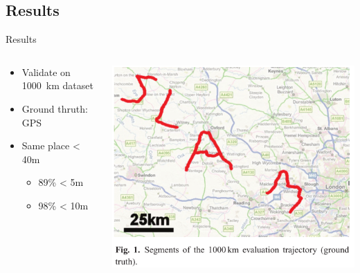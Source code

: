 \subsection{Results}
\begin{frame}{Results}
    \begin{columns}
        \begin{column}{0.4\textwidth}
            \begin{itemize}
                \item Validate on 1000~km dataset
                \item Ground thruth: GPS
                \item Same place < 40m
                    \begin{itemize}
                        \item 89\% < 5m
                        \item 98\% < 10m
                    \end{itemize}
            \end{itemize}
        \end{column}
        \begin{column}{0.6\textwidth}
            \includegraphics[width=1.0\textwidth]{./media/map_fabmap2.png}
        \end{column}
    \end{columns}
\end{frame}

